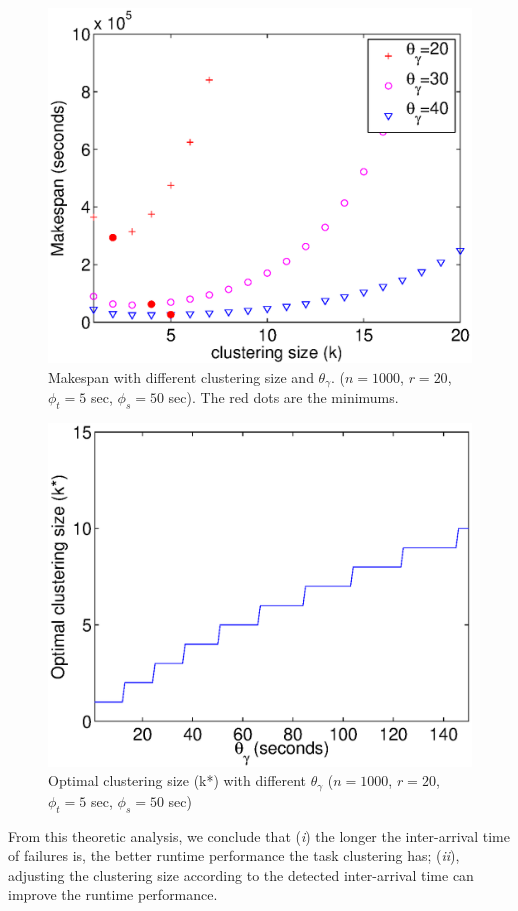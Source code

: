 \documentclass{IOS-Book-Article}
\begin{document}
\begin{figure}[!htb]
\centering
  \includegraphics[width=0.75\linewidth]{model_makespan2.eps}
  \caption{Makespan with different clustering size and $\theta_{\gamma}$. ($n=1000$, $r=20$, $\phi_t=5$ sec, $\phi_s=50$ sec). The red dots are the minimums. }
  \label{fig:model_makespan}
\end{figure}

\begin{figure}[!htb]
\centering
  \includegraphics[width=0.75\linewidth]{model_size2.eps}
  \caption{Optimal clustering size (k*) with different  $\theta_{\gamma}$ ($n=1000$, $r=20$, $\phi_t=5$ sec, $\phi_s=50$ sec)}
  \label{fig:model_size}
\end{figure}


From this theoretic analysis, we conclude that (\emph{i}) the longer the inter-arrival time of failures is, the better runtime performance the task clustering has; (\emph{ii}), adjusting the clustering size according to the detected inter-arrival time can improve the runtime performance. 
\end{document}
